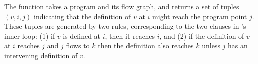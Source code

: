 \noindent
The function  takes a program and its flow graph, and returns a
set of tuples $(v, i, j)$ indicating that the definition of $v$ at $i$ might
reach the program point $j$. These tuples are generated by two rules,
corresponding to the two clauses in 's inner loop: (1) if $v$ is
defined at $i$, then it reaches $i$, and (2) if the definition of $v$ at $i$
reaches $j$ and $j$ flows to $k$ then the definition also reaches $k$ unless $j$
has an intervening definition of $v$.
